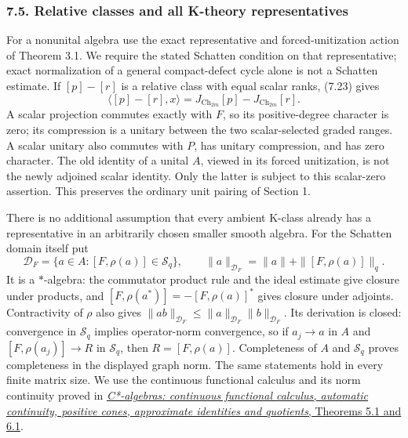\documentclass[
  11pt,
]{article}
\begin{document}
\subsubsection{7.5. Relative classes and all K-theory
representatives}\label{relative-classes-and-all-k-theory-representatives}

For a nonunital algebra use the exact representative and
forced-unitization action of Theorem 3.1. We require the stated Schatten
condition on that representative; exact normalization of a general
compact-defect cycle alone is not a Schatten estimate. If \([p]-[r]\) is
a relative class with equal scalar ranks, (7.23) gives \[
 \langle[p]-[r],x\rangle
    =J_{\operatorname{Ch}_{2m}}[p]
       -J_{\operatorname{Ch}_{2m}}[r].
 \tag{7.24}
\] A scalar projection commutes exactly with \(F\), so its
positive-degree character is zero; its compression is a unitary between
the two scalar-selected graded ranges. A scalar unitary also commutes
with \(P\), has unitary compression, and has zero character. The old
identity of a unital \(A\), viewed in its forced unitization, is not the
newly adjoined scalar identity. Only the latter is subject to this
scalar-zero assertion. This preserves the ordinary unit pairing of
Section 1.

There is no additional assumption that every ambient K-class already has
a representative in an arbitrarily chosen smaller smooth algebra. For
the Schatten domain itself put \[
 \mathcal D_F=\{a\in A:[F,\rho(a)]\in\mathcal S_q\},\qquad
 \|a\|_{\mathcal D_F}=\|a\|+\|[F,\rho(a)]\|_q .
\] It is a \(*\)-algebra: the commutator product rule and the ideal
estimate give closure under products, and
\([F,\rho(a^*)]=-[F,\rho(a)]^*\) gives closure under adjoints.
Contractivity of \(\rho\) also gives
\(\|ab\|_{\mathcal D_F}\leq\|a\|_{\mathcal D_F}\|b\|_{\mathcal D_F}\).
Its derivation is closed: convergence in \(\mathcal S_q\) implies
operator-norm convergence, so if \(a_j\to a\) in \(A\) and
\([F,\rho(a_j)]\to R\) in \(\mathcal S_q\), then \(R=[F,\rho(a)]\).
Completeness of \(A\) and \(\mathcal S_q\) proves completeness in the
displayed graph norm. The same statements hold in every finite matrix
size. We use the continuous functional calculus and its norm continuity
proved in
\href{../foundations-of-von-neumann-algebras/c-star-algebras-continuous-functional-calculus-automatic-continuity-positive-cones.html\#OA-FND-CF-07}{\emph{C*-algebras:
continuous functional calculus, automatic continuity, positive cones,
approximate identities and quotients}, Theorems 5.1 and 6.1}.
\end{document}
